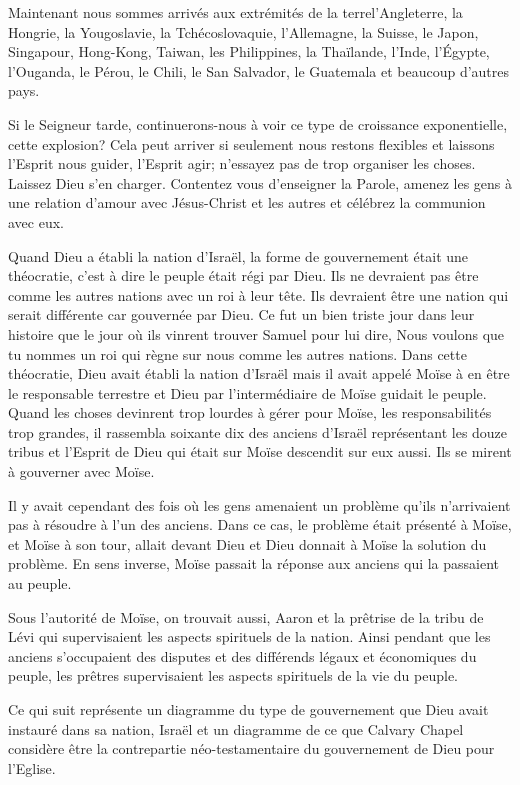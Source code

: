Maintenant nous sommes arrivés aux extrémités de la terre\frcolon l’Angleterre, la Hongrie, la Yougoslavie, la
Tchécoslovaquie, l’Allemagne, la Suisse, le Japon, Singapour, Hong-Kong, Taiwan, les Philippines, la Thaïlande, l’Inde,
l’Égypte, l’Ouganda, le Pérou, le Chili, le San Salvador, le Guatemala et beaucoup d’autres pays.

Si le Seigneur tarde, continuerons-nous à voir ce type de croissance exponentielle, cette explosion? Cela peut arriver
si seulement nous restons flexibles et laissons l’Esprit nous guider, l’Esprit agir; n’essayez pas de trop organiser les
choses. Laissez Dieu s’en charger. Contentez vous d’enseigner la Parole, amenez les gens à une relation d’amour avec
Jésus-Christ et les autres et célébrez la communion avec eux.

Quand Dieu a établi la nation d’Israël, la forme de gouvernement était une théocratie, c’est à dire le peuple était régi
par Dieu. Ils ne devraient pas être comme les autres nations avec un roi à leur tête. Ils devraient être une nation qui
serait différente car gouvernée par Dieu. Ce fut un bien triste jour dans leur histoire que le jour où ils vinrent trouver
Samuel pour lui dire, \og Nous voulons que tu nommes un roi qui règne sur nous comme les autres nations.\fg{} Dans cette
théocratie, Dieu avait établi la nation d’Israël mais il avait appelé Moïse à en être le responsable terrestre et Dieu par
l’intermédiaire de Moïse guidait le peuple. Quand les choses devinrent trop lourdes à gérer pour Moïse, les
responsabilités trop grandes, il rassembla soixante dix des anciens d’Israël représentant les douze tribus et l’Esprit de
Dieu qui était sur Moïse descendit sur eux aussi. Ils se mirent à gouverner avec Moïse.

Il y avait cependant des fois où les gens amenaient un problème qu’ils n’arrivaient pas à résoudre à l’un des anciens.
Dans ce cas, le problème était présenté à Moïse, et Moïse à son tour, allait devant Dieu et Dieu donnait à Moïse la
solution du problème. En sens inverse, Moïse passait la réponse aux anciens qui la passaient au peuple.

Sous l’autorité de Moïse, on trouvait aussi, Aaron et la prêtrise de la tribu de Lévi qui supervisaient les aspects
spirituels de la nation. Ainsi pendant que les anciens s’occupaient des disputes et des différends légaux et
économiques du peuple, les prêtres supervisaient les aspects spirituels de la vie du peuple.

Ce qui suit représente un diagramme du type de gouvernement que Dieu avait instauré dans sa nation, Israël et un
diagramme de ce que Calvary Chapel considère être la contrepartie néo-testamentaire du gouvernement de Dieu pour
l’Eglise.

